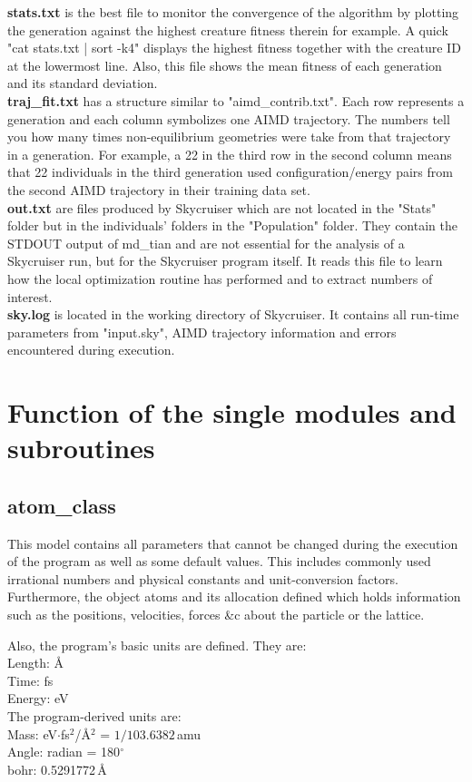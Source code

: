 \documentclass[twoside, 11pt, titlepage, captions=nooneline, a4paper, headsepline]{scrbook}%
\newcommand{\9}{\mathrm}
\newcommand{\0}{\,\mathrm}
\begin{document}
\textbf{stats.txt} is the best file to monitor the convergence of the algorithm by plotting the generation against the highest creature fitness therein for example. A quick "cat stats.txt | sort -k4" displays the highest fitness together with the creature ID at the lowermost line. Also, this file shows the mean fitness of each generation and its standard deviation.\\
\textbf{traj\_fit.txt} has a structure similar to "aimd\_contrib.txt". Each row represents a generation and each column symbolizes one AIMD trajectory. The numbers tell you how many times non-equilibrium geometries were take from that trajectory in a generation. For example, a 22 in the third row in the second column means that 22 individuals in the third generation used configuration/energy pairs from the second AIMD trajectory in their training data set.\\
\textbf{out.txt} are files produced by Skycruiser which are not located in the "Stats" folder but in the individuals' folders in the "Population" folder. They contain the STDOUT output of md\_tian and are not essential for the analysis of a Skycruiser run, but for the Skycruiser program itself. It reads this file to learn how the local optimization routine has performed and to extract numbers of interest.\\
\textbf{sky.log} is located in the working directory of Skycruiser. It contains all run-time parameters from "input.sky", AIMD trajectory information and errors encountered during execution.






\chapter{Function of the single modules and subroutines}
\label{Sec:Modules}
\section{atom\_class}
This model contains all parameters that cannot be changed during the execution of the program as well as some default values. This includes commonly used irrational numbers and physical constants and unit-conversion factors. Furthermore, the object atoms and its allocation defined which holds information such as the positions, velocities, forces \&c about the particle or the lattice.

\noindent Also, the program's basic units  are defined. They are:\\
Length: \AA\\
Time: fs\\
Energy: eV\\
The program-derived units are:\\
Mass: eV$\cdot$fs$^2$/\AA$^2$ = $1/103.6382$\,amu\\
Angle: radian = 180$^\circ$\\
bohr: 0.5291772\,\AA
\end{document}
